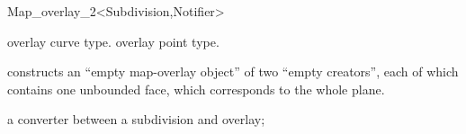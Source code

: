 \begin{ccRefClass}{Map_overlay_2<Subdivision,Notifier>}
  \ccGlue
  \ccGlue


  {overlay curve type.}
  \ccGlue
  {overlay point type.}


    
%     
%    
%    
%    
%    
    

\ccCreation
    
   {constructs an
     ``empty map-overlay object'' of two ``empty creators'', each of which 
     contains one unbounded face, which corresponds to the whole plane.}
  
  {a converter between a subdivision and overlay;}
  

\end{ccRefClass}
